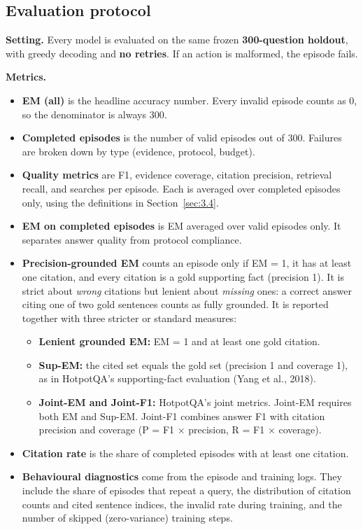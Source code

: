 \subsection{Evaluation protocol}\label{sec:3.7}

\textbf{Setting.} Every model is evaluated on the same frozen
\textbf{300-question holdout}, with greedy decoding and \textbf{no
retries}. If an action is malformed, the episode fails.

\textbf{Metrics.}

\begin{itemize}
\tightlist
\item
  \textbf{EM (all)} is the headline accuracy number. Every invalid
  episode counts as 0, so the denominator is always 300.
\item
  \textbf{Completed episodes} is the number of valid episodes out of
  300. Failures are broken down by type (evidence, protocol, budget).
\item
  \textbf{Quality metrics} are F1, evidence coverage, citation
  precision, retrieval recall, and searches per episode. Each is
  averaged over completed episodes only, using the definitions in
  Section~\ref{sec:3.4}.
\item
  \textbf{EM on completed episodes} is EM averaged over valid episodes
  only. It separates answer quality from protocol compliance.
\item
  \textbf{Precision-grounded EM} counts an episode only if EM = 1, it
  has at least one citation, and every citation is a gold supporting
  fact (precision 1). It is strict about \emph{wrong} citations but
  lenient about \emph{missing} ones: a correct answer citing one of two
  gold sentences counts as fully grounded. It is reported together with
  three stricter or standard measures:

  \begin{itemize}
  \tightlist
  \item
    \textbf{Lenient grounded EM:} EM = 1 and at least one gold citation.
  \item
    \textbf{Sup-EM:} the cited set equals the gold set (precision 1 and
    coverage 1), as in HotpotQA's supporting-fact evaluation (Yang et
    al., 2018).
  \item
    \textbf{Joint-EM and Joint-F1:} HotpotQA's joint metrics. Joint-EM
    requires both EM and Sup-EM. Joint-F1 combines answer F1 with
    citation precision and coverage (P = F1 × precision, R = F1 ×
    coverage).
  \end{itemize}
\item
  \textbf{Citation rate} is the share of completed episodes with at
  least one citation.
\item
  \textbf{Behavioural diagnostics} come from the episode and training
  logs. They include the share of episodes that repeat a query, the
  distribution of citation counts and cited sentence indices, the
  invalid rate during training, and the number of skipped
  (zero-variance) training steps.
\end{itemize}

